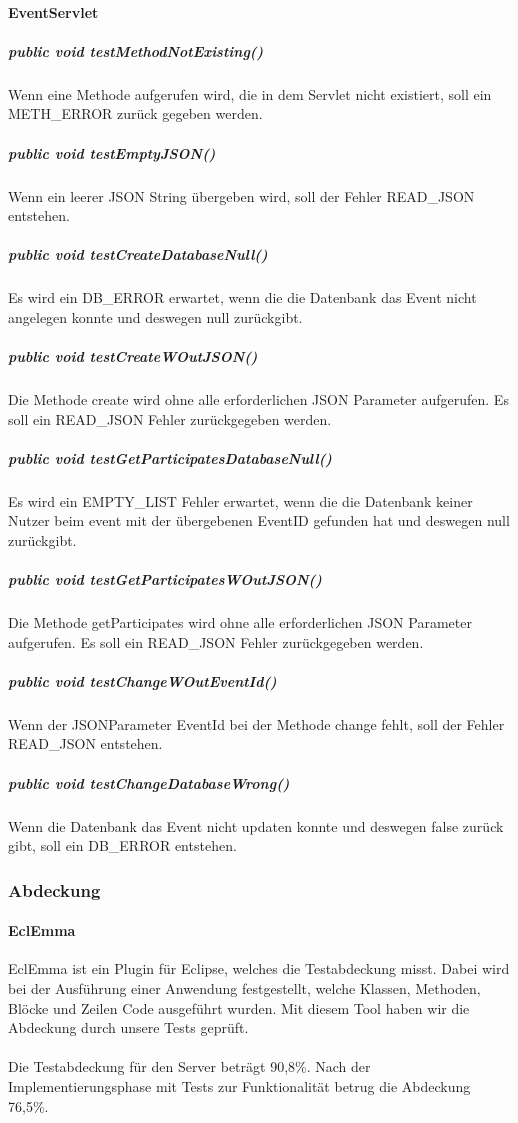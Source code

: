 \documentclass{scrartcl}
\begin{document}
\paragraph{EventServlet}
\subparagraph{public void testMethodNotExisting()}
Wenn eine Methode aufgerufen wird, die in dem Servlet nicht existiert, soll ein METH\_ERROR zurück gegeben werden.
\subparagraph{public void testEmptyJSON()}
Wenn ein leerer JSON String übergeben wird, soll der Fehler READ\_JSON entstehen.
\subparagraph{public void testCreateDatabaseNull()}
Es wird ein DB\_ERROR erwartet, wenn die die Datenbank das Event nicht angelegen konnte und deswegen null zurückgibt.
\subparagraph{public void testCreateWOutJSON()}
Die Methode create wird ohne alle erforderlichen JSON Parameter aufgerufen. Es soll ein READ\_JSON Fehler zurückgegeben werden.
\subparagraph{public void testGetParticipatesDatabaseNull()}
Es wird ein EMPTY\_LIST Fehler erwartet, wenn die die Datenbank keiner Nutzer beim event mit der übergebenen EventID gefunden hat und deswegen null zurückgibt.
\subparagraph{public void testGetParticipatesWOutJSON()}
Die Methode getParticipates wird ohne alle erforderlichen JSON Parameter aufgerufen. Es soll ein READ\_JSON Fehler zurückgegeben werden.
\subparagraph{public void testChangeWOutEventId()}
Wenn der JSONParameter EventId bei der Methode change fehlt, soll der Fehler READ\_JSON entstehen.
\subparagraph{public void testChangeDatabaseWrong()}
 Wenn die Datenbank das Event nicht updaten konnte und deswegen false zurück gibt, soll ein DB\_ERROR entstehen.
 
\newpage
\subsubsection{Abdeckung}
\paragraph{EclEmma}
EclEmma ist ein Plugin für Eclipse, welches die Testabdeckung misst. Dabei wird bei der Ausführung einer Anwendung festgestellt, welche Klassen, Methoden, Blöcke und Zeilen Code ausgeführt wurden. 
Mit diesem Tool haben wir die Abdeckung durch unsere Tests geprüft.
\paragraph{}
Die Testabdeckung für den Server beträgt 90,8\%.
Nach der Implementierungsphase mit Tests zur Funktionalität betrug die Abdeckung 76,5\%.
\end{document}
